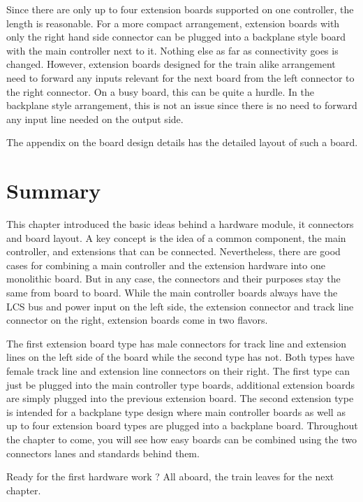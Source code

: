 Since there are only up to four extension boards supported on one controller, the length is reasonable. For a more compact arrangement, extension boards with only the right hand side connector can be plugged into a backplane style board with the main controller next to it. Nothing else as far as connectivity goes is changed. However, extension boards designed for the train alike arrangement need to forward any inputs relevant for the next board from the left connector to the right connector. On a busy board, this can be quite a hurdle. In the backplane style arrangement, this is not an issue since there is no need to forward any input line needed on the output side.

The appendix on the board design details has the detailed layout of such a board.

\section{Summary}

This chapter introduced the basic ideas behind a hardware module, it connectors and board layout. A key concept is the idea of a common component, the main controller, and extensions that can be connected. Nevertheless, there are good cases for combining a main controller and the extension hardware into one monolithic board. But in any case, the connectors and their purposes stay the same from board to board. While the main controller boards always have the LCS bus and power input on the left side, the extension connector and track line connector on the right, extension boards come in two flavors. 

The first extension board type has male connectors for track line and extension lines on the left side of the board while the second type has not. Both types have female track line and extension line connectors on their right. The first type can just be plugged into the main controller type boards, additional extension boards are simply plugged into the previous extension board. The second extension type is intended for a backplane type design where main controller boards as well as up to four extension board types are plugged into a backplane board. Throughout the chapter to come, you will see how easy boards can be combined using the two connectors lanes and standards behind them. 

Ready for the first hardware work ? All aboard, the train leaves for the next chapter.

